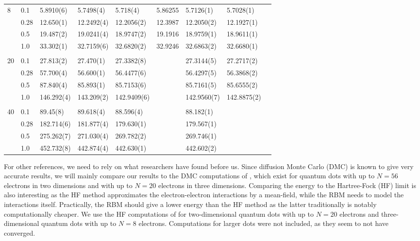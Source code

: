 {\begin{landscape}
\begin{table}
\begin{tabularx}{\hsize}{llR{2.65cm}R{2.65cm}R{2.65cm}R{2.65cm}R{2.65cm}R{2.65cm}R{2.65cm}}
				8 & 0.1 & 5.8910(6) & 5.7498(4) & 5.718(4) & 5.86255 & 5.7126(1) & 5.7028(1) \\ 
				& 0.28 & 12.650(1) & 12.2492(4) & 12.2056(2) & 12.3987 & 12.2050(2) & 12.1927(1) \\
				& 0.5 & 19.487(2) & 19.0241(4) & 18.9747(2) & 19.1916 & 18.9759(1) & 18.9611(1) \\
				& 1.0 & 33.302(1) & 32.7159(6) & 32.6820(2) & 32.9246 & 32.6863(2) & 32.6680(1) \\ 
				\hline \\
				
				20 & 0.1 & 27.813(2) & 27.470(1) & 27.3382(8) & & 27.3144(5) & 27.2717(2) \\ 
				& 0.28 & 57.700(4) & 56.600(1) & 56.4477(6) & & 56.4297(5) & 56.3868(2) \\
				& 0.5 & 87.840(4) & 85.893(1) & 85.7153(6) & & 85.7161(5) & 85.6555(2) \\
				& 1.0 & 146.292(4) & 143.209(2) & 142.9409(6) & & 142.9560(7) & 142.8875(2) \\ \hline \\
				
				40 & 0.1 & 89.45(8) & 89.618(4) & 88.596(4) & & 88.182(1) \\ 
				& 0.28 & 182.714(6) & 181.877(4) & 179.630(1) & & 179.567(1) \\
				& 0.5 & 275.262(7) & 271.030(4) & 269.782(2) & & 269.746(1) \\
				& 1.0 & 452.732(8) & 442.874(4) & 442.630(1) & & 442.602(2) \\ \hline\hline
			\end{tabularx}
		\end{table}
	\end{landscape}
}

For other references, we need to rely on what researchers have found before us. Since diffusion Monte Carlo (DMC) is known to give very accurate results, we will mainly compare our results to the DMC computations of \citet{hogberget_quantum_2013}, which exist for quantum dots with up to $N=56$ electrons in two dimensions and with up to $N=20$ electrons in three dimensions. Comparing the energy to the Hartree-Fock (HF) limit is also interesting as the HF method approximates the electron-electron interactions by a mean-field, while the RBM needs to model the interactions itself. Practically, the RBM should give a lower energy than the HF method as the latter traditionally is notably computationally cheaper. We use the HF computations of \citet{mariadason_quantum_2018} for two-dimensional quantum dots with up to $N=20$ electrons and three-dimensional quantum dots with up to $N=8$ electrons. Computations for larger dots were not included, as they seem to not have converged.

